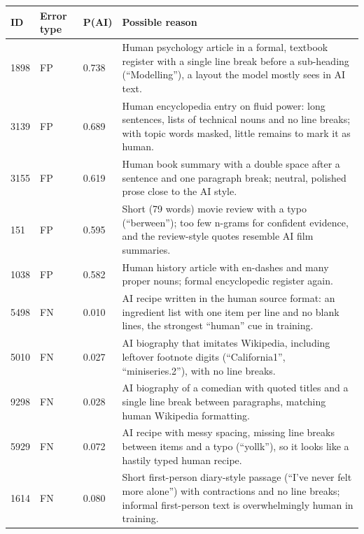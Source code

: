 \begin{tabularx}{\linewidth}{@{}p{0.64in}p{0.70in}p{0.98in}Y@{}}\toprule ID & Error type & P(AI) & Possible reason \\ \midrule
\mbox{1898} & FP & 0.738 & Human psychology article in a formal, textbook register with a single line break before a sub-heading (``Modelling''), a layout the model mostly sees in AI text. \\
\mbox{3139} & FP & 0.689 & Human encyclopedia entry on fluid power: long sentences, lists of technical nouns and no line breaks; with topic words masked, little remains to mark it as human. \\
\mbox{3155} & FP & 0.619 & Human book summary with a double space after a sentence and one paragraph break; neutral, polished prose close to the AI style. \\
\mbox{151} & FP & 0.595 & Short (79 words) movie review with a typo (``berween''); too few n-grams for confident evidence, and the review-style quotes resemble AI film summaries. \\
\mbox{1038} & FP & 0.582 & Human history article with en-dashes and many proper nouns; formal encyclopedic register again. \\
\mbox{5498} & FN & 0.010 & AI recipe written in the human source format: an ingredient list with one item per line and no blank lines, the strongest ``human'' cue in training. \\
\mbox{5010} & FN & 0.027 & AI biography that imitates Wikipedia, including leftover footnote digits (``California1'', ``miniseries.2''), with no line breaks. \\
\mbox{9298} & FN & 0.028 & AI biography of a comedian with quoted titles and a single line break between paragraphs, matching human Wikipedia formatting. \\
\mbox{5929} & FN & 0.072 & AI recipe with messy spacing, missing line breaks between items and a typo (``yollk''), so it looks like a hastily typed human recipe. \\
\mbox{1614} & FN & 0.080 & Short first-person diary-style passage (``I've never felt more alone'') with contractions and no line breaks; informal first-person text is overwhelmingly human in training. \\
\bottomrule\end{tabularx}

